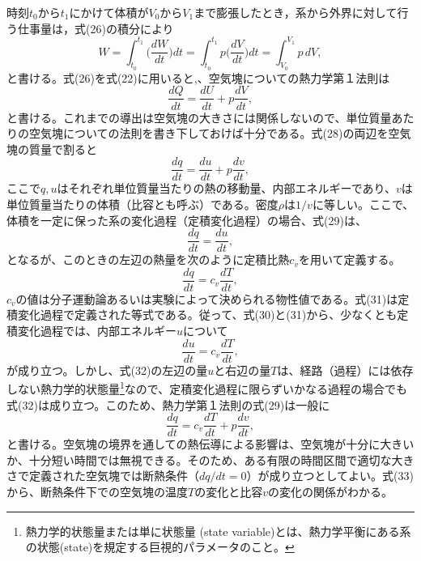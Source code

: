 \documentclass{jsarticle}
\begin{document}
時刻$t_{0}$から$t_{1}$にかけて体積が$V_{0}$から$V_{1}$まで膨張したとき，系から外界に対して行う仕事量は，式(26)の積分により
\begin{equation}
 W=\int_{t_{0}}^{t_{1}}{\bigg (}\frac{dW}{dt}{\bigg )}dt=\int_{t_{0}}^{t_{1}}p{\bigg (}\frac{dV}{dt}{\bigg )}dt=\int_{V_{0}}^{V_{1}}p\,dV,
\end{equation}
と書ける。式(26)を式(22)に用いると,、空気塊についての熱力学第１法則は
\begin{equation}
 \frac{dQ}{dt}=\frac{dU}{dt}+p\frac{dV}{dt},
\end{equation}
と書ける。これまでの導出は空気塊の大きさには関係しないので、単位質量あたりの空気塊についての法則を書き下しておけば十分である。式(28)の両辺を空気塊の質量で割ると
\begin{equation}
 \frac{dq}{dt}=\frac{du}{dt}+p\frac{dv}{dt},
\end{equation}
ここで$q, u$はそれぞれ単位質量当たりの熱の移動量、内部エネルギーであり、$v$は単位質量当たりの体積（比容とも呼ぶ）である。密度$\rho$は$1/v$に等しい。ここで、体積を一定に保った系の変化過程（定積変化過程）の場合、式(29)は、
\begin{equation}
 \frac{dq}{dt}=\frac{du}{dt},
\end{equation}
となるが、このときの左辺の熱量を次のように定積比熱$c_{v}$を用いて定義する。
\begin{equation}
 \frac{dq}{dt}=c_{v}\frac{dT}{dt},
\end{equation}
$c_{v}$の値は分子運動論あるいは実験によって決められる物性値である。式(31)は定積変化過程で定義された等式である。従って、式(30)と(31)から、少なくとも定積変化過程では、内部エネルギー$u$について
\begin{equation}
 \frac{du}{dt}=c_{v}\frac{dT}{dt},
\end{equation}
が成り立つ。しかし、式(32)の左辺の量$u$と右辺の量$T$は、経路（過程）には依存しない熱力学的状態量\footnote{熱力学的状態量または単に状態量 (state variable)とは、熱力学平衡にある系の状態(state)を規定する巨視的パラメータのこと。}なので、定積変化過程に限らずいかなる過程の場合でも式(32)は成り立つ。このため、熱力学第１法則の式(29)は一般に
\begin{equation}
 \frac{dq}{dt}=c_{v}\frac{dT}{dt}+p\frac{dv}{dt},
\end{equation}
と書ける。空気塊の境界を通しての熱伝導による影響は、空気塊が十分に大きいか、十分短い時間では無視できる。そのため、ある有限の時間区間で適切な大きさで定義された空気塊では断熱条件（$dq/dt=0$）が成り立つとしてよい。式(33)から、断熱条件下での空気塊の温度$T$の変化と比容$v$の変化の関係がわかる。
\end{document}
